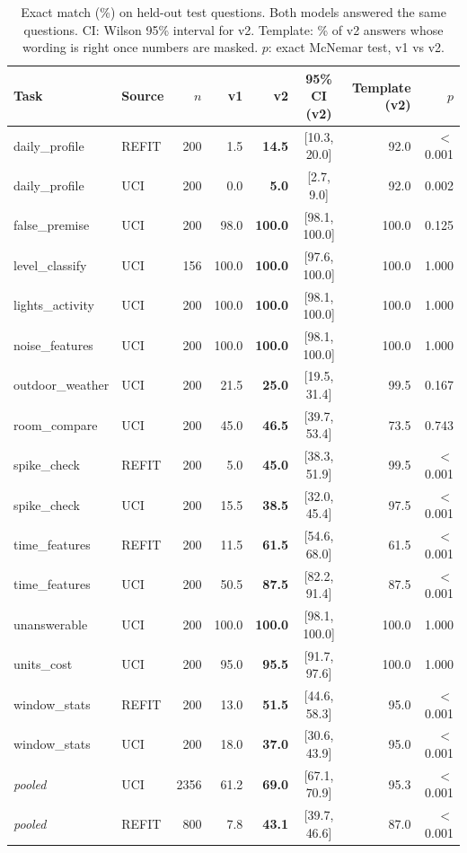 \documentclass[conference]{IEEEtran}
\begin{document}
\begin{table}[t]
\caption{Exact match (\%) on held-out test questions. Both models answered the same questions. CI: Wilson 95\%
interval for v2. Template: \% of v2 answers whose wording is right once numbers are masked. $p$: exact McNemar
test, v1 vs v2.}
\label{tab:em}
\centering
\footnotesize
\begin{tabular}{@{}llrrrcrr@{}}
\toprule
Task & Source & $n$ & v1 & v2 & 95\% CI (v2) & Template (v2) & $p$ \\
\midrule
daily\_profile & REFIT & 200 & 1.5 & \textbf{14.5} & [10.3, 20.0] & 92.0 & $<$0.001 \\
daily\_profile & UCI & 200 & 0.0 & \textbf{5.0} & [2.7, 9.0] & 92.0 & 0.002 \\
false\_premise & UCI & 200 & 98.0 & \textbf{100.0} & [98.1, 100.0] & 100.0 & 0.125 \\
level\_classify & UCI & 156 & 100.0 & \textbf{100.0} & [97.6, 100.0] & 100.0 & 1.000 \\
lights\_activity & UCI & 200 & 100.0 & \textbf{100.0} & [98.1, 100.0] & 100.0 & 1.000 \\
noise\_features & UCI & 200 & 100.0 & \textbf{100.0} & [98.1, 100.0] & 100.0 & 1.000 \\
outdoor\_weather & UCI & 200 & 21.5 & \textbf{25.0} & [19.5, 31.4] & 99.5 & 0.167 \\
room\_compare & UCI & 200 & 45.0 & \textbf{46.5} & [39.7, 53.4] & 73.5 & 0.743 \\
spike\_check & REFIT & 200 & 5.0 & \textbf{45.0} & [38.3, 51.9] & 99.5 & $<$0.001 \\
spike\_check & UCI & 200 & 15.5 & \textbf{38.5} & [32.0, 45.4] & 97.5 & $<$0.001 \\
time\_features & REFIT & 200 & 11.5 & \textbf{61.5} & [54.6, 68.0] & 61.5 & $<$0.001 \\
time\_features & UCI & 200 & 50.5 & \textbf{87.5} & [82.2, 91.4] & 87.5 & $<$0.001 \\
unanswerable & UCI & 200 & 100.0 & \textbf{100.0} & [98.1, 100.0] & 100.0 & 1.000 \\
units\_cost & UCI & 200 & 95.0 & \textbf{95.5} & [91.7, 97.6] & 100.0 & 1.000 \\
window\_stats & REFIT & 200 & 13.0 & \textbf{51.5} & [44.6, 58.3] & 95.0 & $<$0.001 \\
window\_stats & UCI & 200 & 18.0 & \textbf{37.0} & [30.6, 43.9] & 95.0 & $<$0.001 \\
\midrule
\textit{pooled} & UCI & 2356 & 61.2 & \textbf{69.0} & [67.1, 70.9] & 95.3 & $<$0.001 \\
\textit{pooled} & REFIT & 800 & 7.8 & \textbf{43.1} & [39.7, 46.6] & 87.0 & $<$0.001 \\
\bottomrule
\end{tabular}
\end{table}
\end{document}
